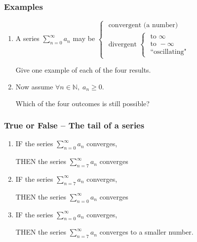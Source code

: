 \documentclass[14pt]{beamer}
\newcommand{\N}{\mathbb{N}}
\newcommand{\p}{\pause}
\newcommand{\azul}[1]{{\color{blue} #1}}
\newcommand{\rojo}[1]{{\color{red} #1}}
\newcommand{\setsize}[1]{\fontsize{#1}{#1}\selectfont} %
\newcommand{\vv}{\vspace{.5cm}}
\newcommand{\vvv}{\vspace{.2cm}}
\begin{document}
	\begin{frame}[t]
		\frametitle{Examples}

		\begin{enumerate}
			\item A series ${\displaystyle \sum_{n=0}^{\infty} a_n}$ may be ${\displaystyle  \begin{cases}\mbox{ convergent (a number) } \\ \mbox{ divergent } \begin{cases}\mbox{ to } \infty \\ \mbox{ to } - \infty \\ \mbox{ ``oscillating"}\end{cases}\end{cases} }$
				\vv

				Give one example of each of the four results. \vv \p

			\item Now assume ${\displaystyle \forall n \in \N, \; a_n \geq 0}$.

				Which of the four outcomes is still possible?
		\end{enumerate}
	\end{frame}
	\begin{frame}[t]
		\setsize{12}
		\frametitle{True or False -- The tail of a series}

		\begin{enumerate}
			\item IF the series \azul{${\displaystyle \sum_{n=0}^{\infty} a_n}$}
				converges,

				THEN the series \rojo{${\displaystyle \sum_{n=7}^{\infty} a_{n}}$} converges
				\vvv

			\item IF the series \rojo{${\displaystyle \sum_{n=7}^{\infty} a_n}$}
				converges,

				THEN the series \azul{${\displaystyle \sum_{n=0}^{\infty} a_{n}}$} converges
				\vvv

			\item IF the series \rojo{${\displaystyle \sum_{n=0}^{\infty} a_n}$}
				converges,

				THEN the series \azul{${\displaystyle \sum_{n=7}^{\infty} a_{n}}$} converges
				to a smaller number.
		\end{enumerate}
	\end{frame}
\end{document}
